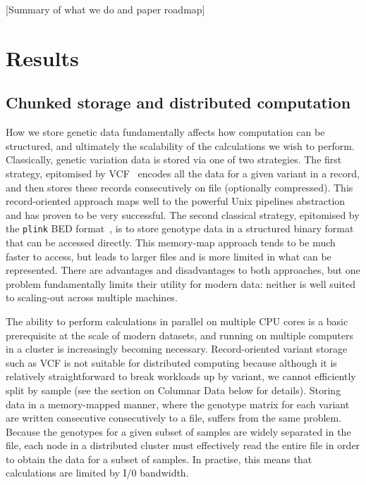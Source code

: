 \documentclass[9pt,lineno]{elife}
\begin{document}
[Summary of what we do and paper roadmap]

\section{Results}

\subsection{Chunked storage and distributed computation}
How we store genetic data fundamentally affects how computation
can be structured, and ultimately the scalability of the calculations
we wish to perform. Classically, genetic variation data is stored via one
of two strategies. The first strategy, epitomised by
VCF~\citep{danecek2011variant} encodes all the data for a given
variant in a record, and then stores these records consecutively on file
(optionally compressed). This record-oriented approach maps well to the
powerful Unix pipelines abstraction and
has proven to be very successful.
The second classical strategy, epitomised
by the \texttt{plink} BED format~\citep{purcell2007plink}, is to
store genotype data in a structured binary format that can be
accessed directly. This memory-map approach tends to
be much faster to access, but leads to larger files and is more
limited in what can be represented. There are advantages and
disadvantages to both approaches, but one problem fundamentally
limits their utility for modern data: neither is well suited to
scaling-out across multiple machines.

The ability to perform calculations in parallel on multiple CPU cores
is a basic prerequisite at the scale of modern datasets, and
running on multiple computers in a cluster is increasingly becoming
necessary. Record-oriented variant storage such as VCF is not suitable
for  distributed computing because although it is relatively
straightforward to break workloads up by variant, we cannot efficiently
split by sample (see the section on Columnar Data below for details).
Storing data in a memory-mapped manner, where the genotype matrix
for each variant are written consecutive consecutively to a file,
suffers from the same problem. Because the genotypes for a given subset
of samples are widely separated in the file, each node in a distributed
cluster must effectively read the entire file in order to obtain the
data for a subset of samples. In practise, this means that calculations
are limited by I/0 bandwidth.
\end{document}
